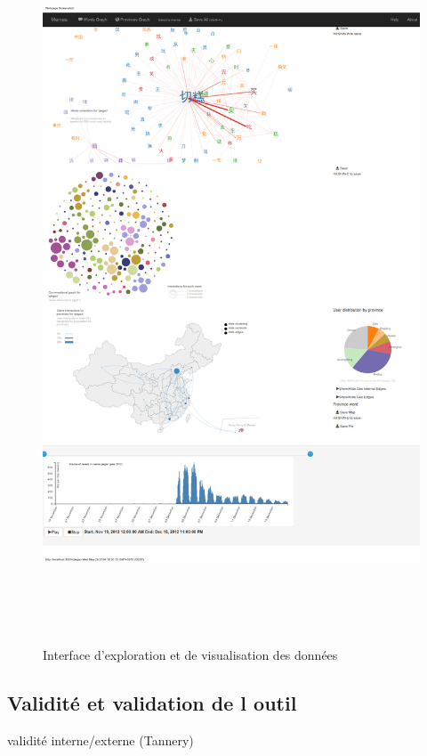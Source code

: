 \begin{figure}
    \label{fig:ui-screenshot}
    \centering
    \includegraphics[width=6.7213in,height=8.3894in]{figures/chap4/ui/ui-screenshot.png}
    \caption{Interface d'exploration et de visualisation des données}
\end{figure}


\subsection[Validité et validation de l outil]{Validité et validation de l outil}

validité interne/externe (Tannery)